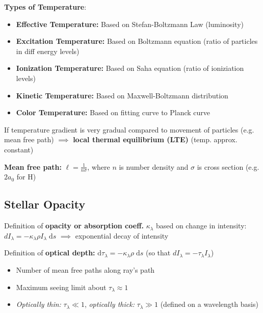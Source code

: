 \documentclass[12pt]{article}
\renewcommand{\dd}{\mathrm{d}}
\begin{document}
\textbf{Types of Temperature}:
\begin{itemize}
    \item \textbf{Effective Temperature:} Based on Stefan-Boltzmann Law (luminosity)
    \item \textbf{Excitation Temperature:} Based on Boltzmann equation (ratio of particles in diff energy levels)
    \item \textbf{Ionization Temperature:} Based on Saha equation (ratio of ioniziation levels)
    \item \textbf{Kinetic Temperature:} Based on Maxwell-Boltzmann distribution
    \item \textbf{Color Temperature:} Based on fitting curve to Planck curve
\end{itemize}

If temperature gradient is very gradual compared to movement of particles (e.g. mean free path) $\implies$ \textbf{local thermal equilibrium (LTE)} (temp. approx. constant)

\textbf{Mean free path:} $\ell = \frac{1}{n\sigma}$, where $n$ is number density and $\sigma$ is cross section (e.g. $2a_0$ for H)

\subsection{Stellar Opacity}

Definition of \textbf{opacity or absorption coeff.} $\kappa_\lambda$ based on change in intensity: $dI_\lambda = -\kappa_\lambda\rho I_\lambda\;\dd s$ $\implies$ exponential decay of intensity

Definition of \textbf{optical depth:} $\dd \tau_\lambda = -\kappa_\lambda\rho\;\dd s$ (so that $dI_\lambda = -\tau_\lambda I_\lambda$)
\begin{itemize}
    \item Number of mean free paths along ray's path
    \item Maximum seeing limit about $\tau_\lambda \approx 1$
    \item \textit{Optically thin:} $\tau_\lambda \ll 1$, \textit{optically thick:} $\tau_\lambda \gg 1$ (defined on a wavelength basis)
\end{itemize}
\end{document}
